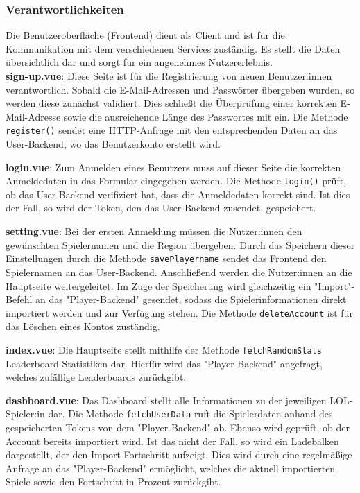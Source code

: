 \subsubsection{Verantwortlichkeiten}

Die Benutzeroberfläche (Frontend) dient als Client und ist für die Kommunikation mit dem verschiedenen Services zuständig. Es stellt die Daten übersichtlich dar und sorgt für ein
angenehmes Nutzererlebnis. \\

\textbf{sign-up.vue}: Diese Seite ist für die Registrierung von neuen Benutzer:innen verantwortlich. Sobald die E-Mail-Adressen und Passwörter übergeben wurden, so werden diese zunächst
validiert. Dies schließt die Überprüfung einer korrekten E-Mail-Adresse sowie die ausreichende Länge des Passwortes mit ein. Die Methode \verb|register()| sendet eine HTTP-Anfrage mit den 
entsprechenden Daten an das User-Backend, wo das Benutzerkonto erstellt wird.
\newline

\textbf{login.vue}: Zum Anmelden eines Benutzers muss auf dieser Seite die korrekten Anmeldedaten in das Formular eingegeben werden. Die Methode \verb|login()| prüft, ob das User-Backend
verifiziert hat, dass die Anmeldedaten korrekt sind. Ist dies der Fall, so wird der Token, den das User-Backend zusendet, gespeichert. 
\newline

\textbf{setting.vue}: Bei der ersten Anmeldung müssen die Nutzer:innen den gewünschten Spielernamen und die Region übergeben. Durch das Speichern dieser Einstellungen durch die Methode \verb|savePlayername|
sendet das Frontend den Spielernamen an das User-Backend. Anschließend werden die Nutzer:innen an die Hauptseite weitergeleitet. Im Zuge der Speicherung wird gleichzeitig ein "Import"-Befehl
an das "Player-Backend" gesendet, sodass die Spielerinformationen direkt importiert werden und zur Verfügung stehen. Die Methode \verb|deleteAccount| ist für das Löschen eines Kontos zuständig.
\newline

\textbf{index.vue}: Die Hauptseite stellt mithilfe der Methode \verb|fetchRandomStats| Leaderboard-Statistiken dar. Hierfür wird das "Player-Backend" angefragt, welches zufällige 
Leaderboards zurückgibt.
\newline

\textbf{dashboard.vue}: Das Dashboard stellt alle Informationen zu der jeweiligen LOL-Spieler:in dar. Die Methode \verb|fetchUserData| ruft die Spielerdaten anhand des gespeicherten Tokens
von dem "Player-Backend" ab. Ebenso wird geprüft, ob der Account bereits importiert wird. Ist das nicht der Fall, so wird ein Ladebalken dargestellt, der den Import-Fortschritt aufzeigt. Dies
wird durch eine regelmäßige Anfrage an das "Player-Backend" ermöglicht, welches die aktuell importierten Spiele sowie den Fortschritt in Prozent zurückgibt.
\newline

